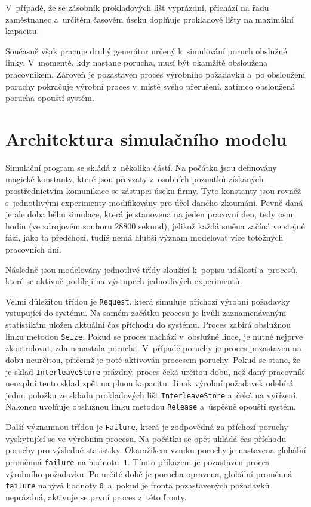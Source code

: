 \documentclass[a4paper, 11pt]{article}
\begin{document}
    V~případě, že se zásobník prokladových lišt vyprázdní, přichází na řadu zaměstnanec a~určitém časovém úseku doplňuje prokladové lišty na maximální kapacitu.

    Současně však pracuje druhý generátor určený k~simulování poruch obslužné linky.
    V~momentě, kdy nastane porucha, musí být okamžitě obsloužena pracovníkem.
    Zároveň je pozastaven proces výrobního požadavku a~po obsloužení poruchy pokračuje výrobní proces v~místě svého přerušení, zatímco obsloužená porucha opouští systém.

\newpage

\section{Architektura simulačního modelu}
    Simulační program se skládá z~několika částí.
    Na počátku jsou definovány magické konstanty, které jsou převzaty z~osobních poznatků získaných prostřednictvím komunikace se zástupci úseku firmy.
    Tyto konstanty jsou rovněž s~jednotlivými experimenty modifikovány pro účel daného zkoumání.
    Pevně daná je ale doba běhu simulace, která je stanovena na jeden pracovní den, tedy osm hodin (ve zdrojovém souboru 28800 sekund), jelikož každá směna začíná ve stejné fázi, jako ta předchozí, tudíž nemá hlubší význam modelovat více totožných pracovních dní.

    Následně jsou modelovány jednotlivé třídy sloužící k~popisu událostí a~procesů, které se aktivně podílejí na výstupech jednotlivých experimentů.

    Velmi důležitou třídou je \texttt{Request}, která simuluje příchozí výrobní požadavky vstupující do systému.
    Na samém začátku procesu je kvůli zaznamenávaným statistikám uložen aktuální čas příchodu do systému.
    Proces zabírá obslužnou linku metodou \texttt{Seize}.
    Pokud se proces nachází v~obslužné lince, je nutné nejprve zkontrolovat, zda nenastala porucha.
    V~případě poruchy je proces pozastaven na dobu neurčitou, přičemž je poté aktivován procesem poruchy.
    Pokud se stane, že je sklad \texttt{InterleaveStore} prázdný, proces čeká určitou dobu, než daný pracovník nenaplní tento sklad zpět na plnou kapacitu.
    Jinak výrobní požadavek odebírá jednu položku ze skladu prokladových lišt \texttt{InterleaveStore} a~čeká na vyřízení.
    Nakonec uvolňuje obslužnou linku metodou \texttt{Release} a~úspěšně opouští systém.

    Další významnou třídou je \texttt{Failure}, která je zodpovědná za příchozí poruchy vyskytující se ve výrobním procesu.
    Na počátku se opět ukládá čas příchodu poruchy pro výsledné statistiky.
    Okamžikem vzniku poruchy je nastavena globální proměnná \texttt{failure} na hodnotu~\texttt{1}.
    Tímto příkazem je pozastaven proces výrobního požadavku.
    Po určité době je porucha opravena, globální proměnná \texttt{failure} nabývá hodnoty \texttt{0}~a~pokud je fronta pozastavených požadavků neprázdná, aktivuje se první proces z~této fronty.
\end{document}
